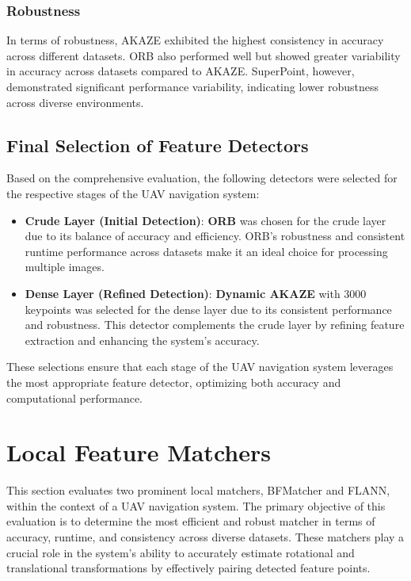 \subsubsection{Robustness}

In terms of robustness, AKAZE exhibited the highest consistency in accuracy across different datasets. ORB also performed well but showed greater variability in accuracy across datasets compared to AKAZE. SuperPoint, however, demonstrated significant performance variability, indicating lower robustness across diverse environments.

\subsection{Final Selection of Feature Detectors}

Based on the comprehensive evaluation, the following detectors were selected for the respective stages of the UAV navigation system:

\begin{itemize}
    \item \textbf{Crude Layer (Initial Detection)}: \textbf{ORB} was chosen for the crude layer due to its balance of accuracy and efficiency. ORB's robustness and consistent runtime performance across datasets make it an ideal choice for processing multiple images.
    
    \item \textbf{Dense Layer (Refined Detection)}: \textbf{Dynamic AKAZE} with 3000 keypoints was selected for the dense layer due to its consistent performance and robustness. This detector complements the crude layer by refining feature extraction and enhancing the system's accuracy.
\end{itemize}
These selections ensure that each stage of the UAV navigation system leverages the most appropriate feature detector, optimizing both accuracy and computational performance.



\section{Local Feature Matchers}

This section evaluates two prominent local matchers, BFMatcher and FLANN, within the context of a UAV navigation system. The primary objective of this evaluation is to determine the most efficient and robust matcher in terms of accuracy, runtime, and consistency across diverse datasets. These matchers play a crucial role in the system's ability to accurately estimate rotational and translational transformations by effectively pairing detected feature points.


